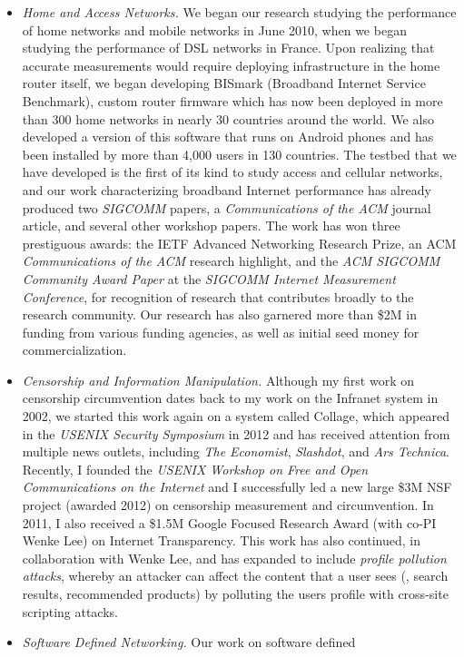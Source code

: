 \begin{itemize}
\item {\em Home and Access Networks.}  We began our research studying
the performance of home networks and mobile networks in June 2010, when
we began studying the performance of DSL networks in France.  Upon
realizing that accurate measurements would require deploying
infrastructure in the home router itself, we began developing BISmark
(Broadband Internet Service Benchmark), custom router firmware which has
now been deployed in more than 300 home networks in nearly 30 countries
around the world.  We also developed a version of this software that
runs on Android phones and has been installed by more than 4,000 users
in 130 countries.  The testbed that we have developed is the first of
its kind to study access and cellular networks, and our work
characterizing broadband Internet performance has already produced two
{\em SIGCOMM} papers, a {\em Communications of the ACM} journal article,
and several other workshop papers.  The work has won three prestiguous
awards: the IETF Advanced Networking Research Prize, an ACM {\em
Communications of the ACM} research highlight, and the {\em ACM SIGCOMM
Community Award Paper} at the {\em SIGCOMM Internet Measurement
Conference}, for recognition of research that contributes broadly to the
research community.  Our research has also garnered more than \$2M in
funding from various funding agencies, as well as initial seed money for
commercialization.
%
\item {\em Censorship and Information Manipulation.} Although my first
work on censorship circumvention dates back to my work on the Infranet
system in 2002, we started this work again on a system called Collage,
which appeared in the {\em USENIX Security Symposium} in 2012 and has
received attention from multiple news outlets, including {\em The
Economist}, {\em Slashdot}, and {\em Ars Technica}.  Recently, I founded
the {\em USENIX Workshop on Free and Open Communications on the
Internet} and I successfully led a new large \$3M NSF project (awarded 2012)
on censorship measurement and circumvention.  In 2011, I also received
a \$1.5M Google Focused Research Award (with co-PI Wenke Lee) on
Internet Transparency.  This work has also continued, in collaboration
with Wenke Lee, and has expanded to include {\em profile
pollution attacks}, whereby an attacker can affect the content that a
user sees (\eg, search results, recommended products) by polluting the
users profile with cross-site scripting attacks.
% 
\item {\em Software Defined Networking.} Our work on software defined

\end{itemize}
